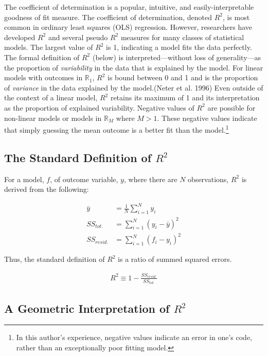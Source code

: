 \documentclass[conference,final,]{IEEEtran}
\begin{document}
The coefficient of determination is a popular, intuitive, and
easily-interpretable goodness of fit measure. The coefficient of
determination, denoted \(R^2\), is most common in ordinary least squares
(OLS) regression. However, researchers have developed \(R^2\) and
several pseudo \(R^2\) measures for many classes of statistical models.
The largest value of \(R^2\) is 1, indicating a model fits the data
perfectly. The formal definition of \(R^2\) (below) is
interpreted---without loss of generality---as the proportion of
\emph{variability} in the data that is explained by the model. For
linear models with outcomes in \(\mathbb{R}_1\), \(R^2\) is bound
between 0 and 1 and is the proportion of \emph{variance} in the data
explained by the model.(Neter et al. 1996) Even outside of the context
of a linear model, \(R^2\) retains its maximum of 1 and its
interpretation as the proportion of explained variability. Negative
values of \(R^2\) are possible for non-linear models or models in
\(\mathbb{R}_M\) where \(M > 1\). These negative values indicate that
simply guessing the mean outcome is a better fit than the
model.\footnote{In this author's experience, negative values indicate an
  error in one's code, rather than an exceptionally poor fitting model.}

\hypertarget{the-standard-definition-of-r2}{%
\subsection{\texorpdfstring{The Standard Definition of
\(R^2\)}{The Standard Definition of R\^{}2}}\label{the-standard-definition-of-r2}}

For a model, \(f\), of outcome variable, \(y\), where there are \(N\)
observations, \(R^2\) is derived from the following:

\begin{align}
  \bar{y} &= \frac{1}{N}\sum_{i=1}^{N}y_i\\
  SS_{tot.} &= \sum_{i=1}^N{(y_i-\bar{y})^2}\\
  SS_{resid.} &= \sum_{i=1}^N{(f_i-y_i)^2}
\end{align}

Thus, the standard definition of \(R^2\) is a ratio of summed squared
errors.

\begin{align}
    R^2 \equiv 1 - \frac{SS_{resid.}}{SS_{tot.}}
\end{align}

\hypertarget{a-geometric-interpretation-of-r2}{%
\subsection{\texorpdfstring{A Geometric Interpretation of
\(R^2\)}{A Geometric Interpretation of R\^{}2}}\label{a-geometric-interpretation-of-r2}}
\end{document}
